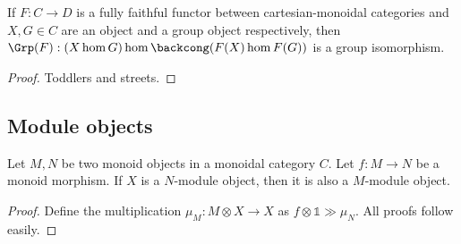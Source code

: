 \begin{lemma}
  \label{0-full-faithful-grp-hom}
  \leanok

  If $F : C \to D$ is a fully faithful functor between cartesian-monoidal categories
  and $X, G \in C$ are an object and a group object respectively,
  then $\Grp(F) : (X \hom G) \hom \backcong (F(X) \hom F(G))$ is a group isomorphism.
\end{lemma}
\begin{proof}
  \leanok

  Toddlers and streets.
\end{proof}


\subsection{Module objects}


\begin{proposition}
  \label{0-comap-mod}

  Let $M, N$ be two monoid objects in a monoidal category $C$.
  Let $f : M \to N$ be a monoid morphism.
  If $X$ is a $N$-module object, then it is also a $M$-module object.
\end{proposition}
\begin{proof}

  Define the multiplication $\mu_M : M \otimes X \to X$ as $f \otimes \mathbb 1 \gg \mu_N$.
  All proofs follow easily.
\end{proof}
